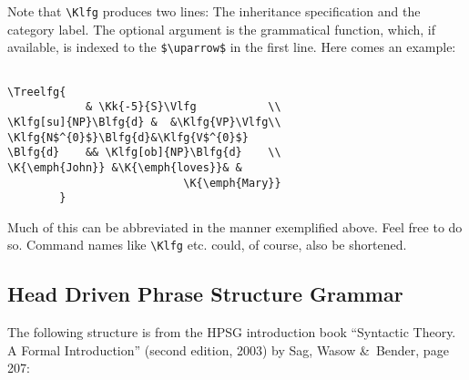 \documentclass[12pt,a4paper]{article}
\begin{document}
Note that \verb|\Klfg| produces two lines: The inheritance specification and the
category label. The optional argument is the grammatical function, which, if
available, is indexed to the \verb|$\uparrow$| in the first line. Here comes an
example:  \vspace*{-3ex}

\begin{minipage}[t]{4.5cm}
\end{minipage}
\begin{minipage}[t]{9cm}
\begin{verbatim}

\Treelfg{             
            & \Kk{-5}{S}\Vlfg           \\ 
\Klfg[su]{NP}\Blfg{d} &  &\Klfg{VP}\Vlfg\\
\Klfg{N$^{0}$}\Blfg{d}&\Klfg{V$^{0}$}
\Blfg{d}    && \Klfg[ob]{NP}\Blfg{d}    \\
\K{\emph{John}} &\K{\emph{loves}}& & 
                           \K{\emph{Mary}}
        }
\end{verbatim}
\end{minipage}

Much of this can be abbreviated in the manner exemplified above. Feel free to do
so. Command names like \verb|\Klfg| etc. could, of course, also be shortened. 


\subsection{Head Driven Phrase Structure Grammar}

The following structure is from the HPSG introduction book ``Syntactic
Theory. A Formal Introduction'' (second edition, 2003) by Sag, Wasow \&\
Bender, page 207:

\newcommand{\AVMone}{\begin{avm}\@1NP$_{i}$\end{avm}}
\newcommand{\AVMtwo}{\begin{avm} \[ SPR & \q< \@1 \q> \\ COMPS & \q<~ \q> \] \end{avm}}
\newcommand{\AVMthree}{\begin{avm} \[ SPR & \q< \@1 \q> \\ COMPS & \q< \@2 \q> \\
                                      ARG-ST & \q< \@1 , \@2 \q> \]            \end{avm}} 
\newcommand{\AVMfour}{\begin{avm}\@2NP$_{i}$\end{avm}}
\end{document}
